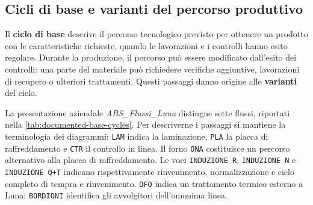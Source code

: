 \subsection{Cicli di base e varianti del percorso produttivo}
\label{sec:base-production-cycles}

Il \textbf{ciclo di base} descrive il percorso tecnologico previsto per ottenere un prodotto con le caratteristiche richieste, quando le lavorazioni e i controlli hanno esito regolare. Durante la produzione, il percorso può essere modificato dall'esito dei controlli: una parte del materiale può richiedere verifiche aggiuntive, lavorazioni di recupero o ulteriori trattamenti. Questi passaggi danno origine alle \textbf{varianti} del ciclo.

La presentazione aziendale \emph{ABS\_Flussi\_Luna} distingue sette flussi, riportati nella \cref{tab:documented-base-cycles}. Per descriverne i passaggi si mantiene la terminologia dei diagrammi: \texttt{LAM} indica la laminazione, \texttt{PLA} la placca di raffreddamento e \texttt{CTR} il controllo in linea. Il forno \texttt{ONA} costituisce un percorso alternativo alla placca di raffreddamento. Le voci \texttt{INDUZIONE R}, \texttt{INDUZIONE N} e \texttt{INDUZIONE Q+T} indicano rispettivamente rinvenimento, normalizzazione e ciclo completo di tempra e rinvenimento. \texttt{DFO} indica un trattamento termico esterno a Luna; \texttt{BORDIONI} identifica gli avvolgitori dell'omonima linea.

